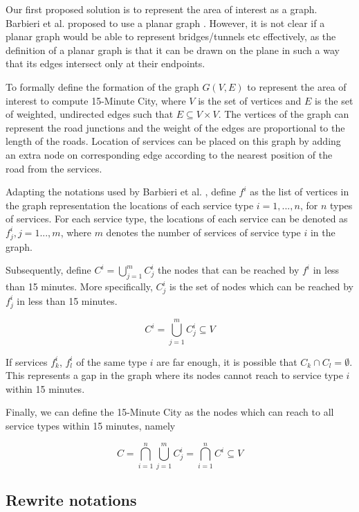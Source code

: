 
Our first proposed solution is to represent the area of interest as a graph. Barbieri et al. proposed to use a planar graph \cite{barbieri_graph_2023}. However, it is not clear if a planar graph would be able to represent bridges/tunnels etc effectively, as the definition of a planar graph is that it can be drawn on the plane in such a way that its edges intersect only at their endpoints.

To formally define the formation of the graph $G(V,E)$ to represent the area of interest to compute 15-Minute City, where $V$ is the set of vertices and $E$ is the set of weighted, undirected edges such that $E\subseteq V\times V$. The vertices of the graph can represent the road junctions and the weight of the edges are proportional to the length of the roads. Location of services can be placed on this graph by adding an extra node on corresponding edge according to the nearest position of the road from the services.

Adapting the notations used by Barbieri et al. \cite{barbieri_graph_2023}, define $f^i$ as the list of vertices in the graph representation the locations of each service type $i=1,...,n$, for $n$ types of services. For each service type, the locations of each service can be denoted as $f^i_j,j=1...,m$, where $m$ denotes the number of services of service type $i$ in the graph.

Subsequently, define $C^i=\bigcup\limits_{j=1}^m C^i_j$ the nodes that can be reached by $f^i$ in less than 15 minutes. More specifically, $C^i_j$ is the set of nodes which can be reached by $f^i_j$ in less than 15 minutes.

$$C^i=\bigcup\limits_{j=1}^m C^i_j\subseteq V$$

If services $f^i_k$, $f^i_l$ of the same type $i$ are far enough, it is possible that $C_k\cap C_l=\emptyset$. This represents a gap in the graph where its nodes cannot reach to service type $i$ within 15 minutes.

Finally, we can define the 15-Minute City as the nodes which can reach to all service types within 15 minutes, namely

$$C=\bigcap\limits_{i=1}^n\bigcup\limits_{j=1}^m C^i_j=\bigcap\limits_{i=1}^n C^i\subseteq V$$

\subsection{Rewrite notations}

